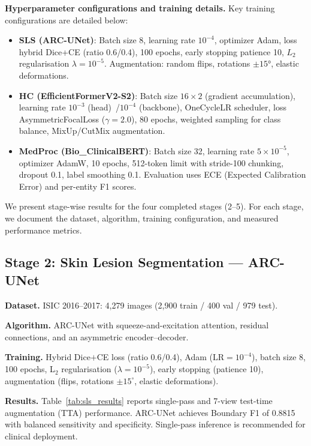 \documentclass[conference]{IEEEtran}
\begin{document}
\textbf{Hyperparameter configurations and training details.} Key training
configurations are detailed below:

\begin{itemize}[leftmargin=*]
    \item \textbf{SLS (ARC-UNet)}: Batch size 8, learning rate $10^{-4}$,
          optimizer Adam, loss hybrid Dice+CE (ratio 0.6/0.4), 100 epochs,
          early stopping patience 10, $L_2$ regularisation $\lambda=10^{-5}$.
          Augmentation: random flips, rotations $\pm 15°$, elastic deformations.
    \item \textbf{HC (EfficientFormerV2-S2)}: Batch size $16 \times 2$
          (gradient accumulation), learning rate $10^{-3}$ (head)~/$10^{-4}$
          (backbone), OneCycleLR scheduler, loss AsymmetricFocalLoss
          ($\gamma=2.0$), 80 epochs, weighted sampling for class balance,
          MixUp/CutMix augmentation.
    \item \textbf{MedProc (Bio\_ClinicalBERT)}: Batch size 32, learning rate $5 \times 10^{-5}$,
          optimizer AdamW, 10 epochs, 512-token limit with stride-100 chunking,
          dropout 0.1, label smoothing 0.1. Evaluation uses ECE (Expected
          Calibration Error) and per-entity F1 scores.
\end{itemize}

We present stage-wise results for the four completed stages (2--5).
For each stage, we document the dataset, algorithm, training
configuration, and measured performance metrics.

\subsection{Stage 2: Skin Lesion Segmentation --- ARC-UNet}

\textbf{Dataset.} ISIC 2016--2017: 4,279 images (2,900 train / 400 val
/ 979 test).

\textbf{Algorithm.} ARC-UNet with squeeze-and-excitation attention,
residual connections, and an asymmetric encoder--decoder.

\textbf{Training.} Hybrid Dice$+$CE loss (ratio 0.6/0.4), Adam
($\mathrm{LR}=10^{-4}$), batch size 8, 100 epochs, L$_2$
regularisation ($\lambda=10^{-5}$), early stopping (patience 10),
augmentation (flips, rotations $\pm15^{\circ}$, elastic deformations).

\textbf{Results.} Table~\ref{tab:sls_results} reports single-pass and
7-view test-time augmentation (TTA) performance. ARC-UNet achieves
Boundary F1 of 0.8815 with balanced sensitivity and specificity.
Single-pass inference is recommended for clinical deployment.
\end{document}
